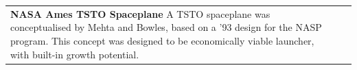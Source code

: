 {\begin{landscape}
\begin{xltabular}{\linewidth}{|X|X|X|}
	\\
	\hline \small 
	\textbf{NASA Ames TSTO Spaceplane}\cite{Mehta2001}\newline\newline
	A TSTO spaceplane was conceptualised by Mehta and Bowles\cite{Mehta2001}, based on a '93 design for the NASP program. This concept was designed to be economically viable launcher, with built-in growth potential. 
	&\small
	

\end{xltabular}
\end{landscape}}

